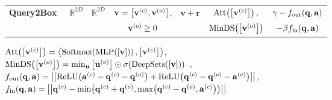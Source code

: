 \begin{table}[H]
\begin{adjustbox}{width=\textwidth}
\begin{tabular}{lcccccc}
 \multirow{2}{*}{\textbf{Query2Box}~\cite{ren_query2box_2020}} & \multirow{2}{*}{$\mathbb{R}^{2D}$} & \multirow{2}{*}{$\mathbb{R}^{2D}$} & $\mathbf{v}=\off{\mathbf{v}^{\of{c}}, \mathbf{v}^{\of{o}}}$, & \multirow{2}{*}{$\mathbf{v} + \mathbf{r}$} & $\text{Att}\of{\off{\mathbf{v}^{\of{c}}}},$ & $\gamma - f_{\text{out}}\of{\mathbf{q},\mathbf{a}}  $\\
  &  &  & $\mathbf{v}^{\of{o}} \geq 0$ & & $\text{MinDS}\of{\off{\mathbf{v}^{\of{o}}}}$  & $-\beta f_{\text{in}}\of{\mathbf{q},\mathbf{a}}$  \\
\bottomrule
\end{tabular}
\end{adjustbox}
$\text{Att}\of{\off{\mathbf{v}^{\of{c}}}}=\ang{ \text{Softmax}\of{\text{MLP}\of{\off{\mathbf{v}}}}, \off{\mathbf{v}^{\of{c}}} }$, \\$\text{MinDS}\of{\off{\mathbf{v}^{\of{o}}}} = \min_{\mathbf{u}}{\off{\mathbf{u}^{\of{o}}}} \odot \sigma\of{\text{DeepSets}\of{\off{\mathbf{v}}}}$~\cite{zaheer_deep_2017,hamilton_embedding_2018}, \\
$f_{\text{out}}\of{\mathbf{q},\mathbf{a}} = \abs{\abs{\text{ReLU}\of{\mathbf{a}^{\of{c}} - \mathbf{q}^{\of{c}} - \mathbf{q}^{\of{o}}} + \text{ReLU}\of{\mathbf{q}^{\of{c}} - \mathbf{q}^{\of{o}} - \mathbf{a}^{\of{c}}}}}$,\\
$f_{\text{in}}\of{\mathbf{q},\mathbf{a}} = \abs{\abs{\mathbf{q}^{\of{c}} - \min\of{\mathbf{q}^{\of{c}} + \mathbf{q}^{\of{o}}, \max\of{\mathbf{q}^{\of{c}} - \mathbf{q}^{\of{o}},\mathbf{a}^{\of{c}}}}}}$
\end{table}
